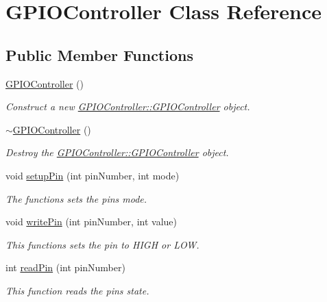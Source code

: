 \hypertarget{classGPIOController}{}\section{G\+P\+I\+O\+Controller Class Reference}
\label{classGPIOController}
\subsection*{Public Member Functions}
\begin{DoxyCompactItemize}
\item 
\mbox{\label{classGPIOController_a4d8d168fd28a39588bb4f0cbbc4a9c68}} 
\hyperlink{classGPIOController_a4d8d168fd28a39588bb4f0cbbc4a9c68}{G\+P\+I\+O\+Controller} ()
\begin{DoxyCompactList}\small\item\em Construct a new \hyperlink{classGPIOController_a4d8d168fd28a39588bb4f0cbbc4a9c68}{G\+P\+I\+O\+Controller\+::\+G\+P\+I\+O\+Controller} object. \end{DoxyCompactList}\item 
\mbox{\label{classGPIOController_aa70ab5fdd57d971ce87a59b7df678c39}} 
\hyperlink{classGPIOController_aa70ab5fdd57d971ce87a59b7df678c39}{$\sim$\+G\+P\+I\+O\+Controller} ()
\begin{DoxyCompactList}\small\item\em Destroy the \hyperlink{classGPIOController_a4d8d168fd28a39588bb4f0cbbc4a9c68}{G\+P\+I\+O\+Controller\+::\+G\+P\+I\+O\+Controller} object. \end{DoxyCompactList}\item 
void \hyperlink{classGPIOController_a3ed1cb3ef1e79636604c9eb24b1eada6}{setup\+Pin} (int pin\+Number, int mode)
\begin{DoxyCompactList}\small\item\em The functions sets the pins mode. \end{DoxyCompactList}\item 
void \hyperlink{classGPIOController_afec1b6d1415900dc1f99050a471b9f50}{write\+Pin} (int pin\+Number, int value)
\begin{DoxyCompactList}\small\item\em This functions sets the pin to H\+I\+GH or L\+OW. \end{DoxyCompactList}\item 
int \hyperlink{classGPIOController_a90288cf1fa64c2e00e9b7ecfc35dbd54}{read\+Pin} (int pin\+Number)
\begin{DoxyCompactList}\small\item\em This function reads the pin\textquotesingle{}s state. \end{DoxyCompactList}\end{DoxyCompactItemize}


